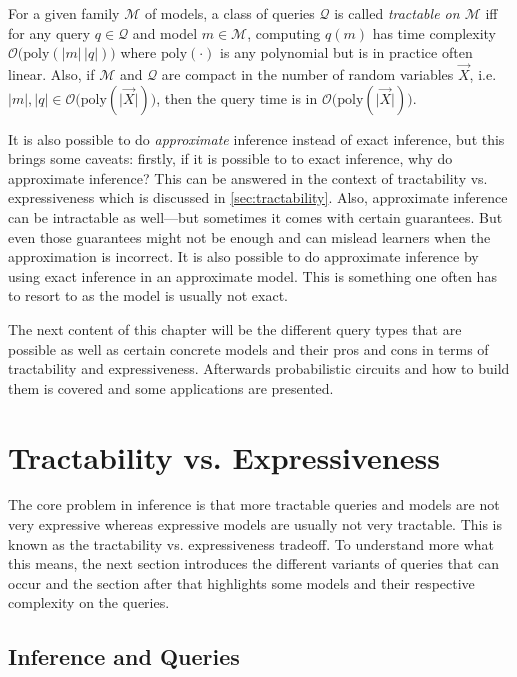 	For a given family \(\mathcal{M}\) of models, a class of queries \(\mathcal{Q}\) is called \emph{tractable on \(\mathcal{M}\)} iff for any query \( q \in \mathcal{Q} \) and model \( m \in \mathcal{M} \), computing \( q(m) \) has time complexity \( \mathcal{O}\big( \mathrm{poly}(\lvert m \rvert \, \lvert q \rvert) \big) \) where \( \mathrm{poly}(\cdot) \) is any polynomial but is in practice often linear. Also, if \(\mathcal{M}\) and \(\mathcal{Q}\) are compact in the number of random variables \(\vec{X}\), i.e. \( \lvert m \rvert, \lvert q \rvert \in \mathcal{O}\big( \mathrm{poly}(\lvert \vec{X} \rvert) \big) \), then the query time is in \( \mathcal{O}\big( \mathrm{poly}(\lvert \vec{X} \rvert) \big) \).

	It is also possible to do \emph{approximate} inference instead of exact inference, but this brings some caveats: firstly, if it is possible to to exact inference, why do approximate inference? This can be answered in the context of tractability vs. expressiveness which is discussed in \autoref{sec:tractability}. Also, approximate inference can be intractable as well---but sometimes it comes with certain guarantees. But even those guarantees might not be enough and can mislead learners when the approximation is incorrect. It is also possible to do approximate inference by using exact inference in an approximate model. This is something one often has to resort to as the model is usually not exact.

	The next content of this chapter will be the different query types that are possible as well as certain concrete models and their pros and cons in terms of tractability and expressiveness. Afterwards probabilistic circuits and how to build them is covered and some applications are presented.

	\section{Tractability vs. Expressiveness}
		The core problem in inference is that more tractable queries and models are not very expressive whereas expressive models are usually not very tractable. This is known as the tractability vs. expressiveness tradeoff. To understand more what this means, the next section introduces the different variants of queries that can occur and the section after that highlights some models and their respective complexity on the queries.

		\subsection{Inference and Queries}
			\label{subsec:queries}

